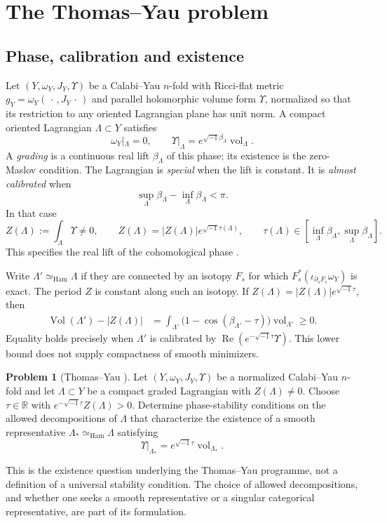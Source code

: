 \documentclass[12pt,reqno]{amsart}
\numberwithin{equation}{section}
\theoremstyle{plain}
\theoremstyle{definition}
\newtheorem{problem}[theorem]{Problem}
\newcommand{\R}{\mathbb R}
\begin{document}
\section{The Thomas--Yau problem}\label{Thomas-Yau}
\subsection{Phase, calibration and existence}
Let $(Y,\omega_Y,J_Y,\Upsilon)$ be a Calabi--Yau $n$-fold with
Ricci-flat metric $g_Y=\omega_Y(\,\cdot\,,J_Y\,\cdot\,)$ and parallel
holomorphic volume form $\Upsilon$, normalized so that its restriction
to any oriented Lagrangian plane has unit norm. A compact oriented
Lagrangian $\Lambda\subset Y$ satisfies
\[
 \omega_Y|_\Lambda=0,\qquad
 \Upsilon|_\Lambda=e^{\sqrt{-1}\beta_\Lambda}
       \operatorname{vol}_\Lambda.
\]
A \emph{grading} is a continuous real lift $\beta_\Lambda$ of this phase;
its existence is the zero-Maslov condition. The Lagrangian is
\emph{special} when the lift is constant. It is \emph{almost calibrated}
when
\[
 \sup_\Lambda\beta_\Lambda-\inf_\Lambda\beta_\Lambda<\pi.
\]
In that case
\[
 Z(\Lambda):=\int_\Lambda\Upsilon\ne0,\qquad
 Z(\Lambda)=|Z(\Lambda)|e^{\sqrt{-1}\tau(\Lambda)},\qquad
 \tau(\Lambda)\in[\inf_\Lambda\beta_\Lambda,
                    \sup_\Lambda\beta_\Lambda].
\]
This specifies the real lift of the cohomological phase
\cite[Sections 1--2]{TY02}.

Write $\Lambda'\simeq_{\mathrm{Ham}}\Lambda$ if they are connected by
an isotopy $F_s$ for which
$F_s^*(\iota_{\partial_sF_s}\omega_Y)$ is exact.
The period $Z$ is constant along such an isotopy. If
$Z(\Lambda)=|Z(\Lambda)|e^{\sqrt{-1}\tau}$, then
\begin{align}
 \operatorname{Vol}(\Lambda')-|Z(\Lambda)|
 &=\int_{\Lambda'}
   \bigl(1-\cos(\beta_{\Lambda'}-\tau)\bigr)
   \operatorname{vol}_{\Lambda'}\geq0.\label{calibration-deficit}
\end{align}
Equality holds precisely when $\Lambda'$ is calibrated by
$\operatorname{Re}(e^{-\sqrt{-1}\tau}\Upsilon)$.
This lower bound does not supply compactness of smooth minimizers.

\begin{problem}[Thomas--Yau {\cite[Section 1]{TY02}}]
\label{problem-Thomas-Yau-existence}
Let $(Y,\omega_Y,J_Y,\Upsilon)$ be a normalized Calabi--Yau $n$-fold
and let $\Lambda\subset Y$ be a compact graded Lagrangian with
$Z(\Lambda)\ne0$. Choose $\tau\in\R$ with
$e^{-\sqrt{-1}\tau}Z(\Lambda)>0$. Determine phase-stability conditions on the allowed
decompositions of $\Lambda$ that characterize the existence of a smooth
representative $\Lambda_*\simeq_{\mathrm{Ham}}\Lambda$ satisfying
\[
 \Upsilon|_{\Lambda_*}
 =e^{\sqrt{-1}\tau}\operatorname{vol}_{\Lambda_*}.
\]
\end{problem}
This is the existence question underlying the Thomas--Yau programme,
not a definition of a universal stability condition. The choice of
allowed decompositions, and whether one seeks a smooth representative
or a singular categorical representative, are part of its formulation.
\end{document}
